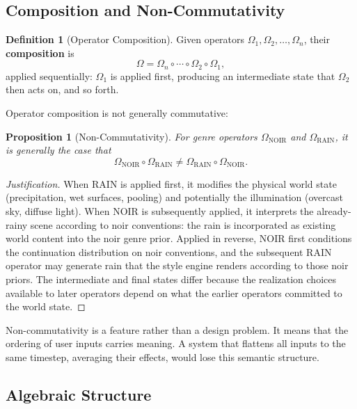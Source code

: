 \documentclass[12pt,a4paper]{article}
\theoremstyle{plain}
\newtheorem{proposition}[theorem]{Proposition}
\theoremstyle{definition}
\newtheorem{definition}[theorem]{Definition}
\theoremstyle{remark}
\begin{document}
\subsection{Composition and Non-Commutativity}

\begin{definition}[Operator Composition]
Given operators $\Omega_1, \Omega_2, \ldots, \Omega_n$, their \textbf{composition} is
\[
\Omega = \Omega_n \circ \cdots \circ \Omega_2 \circ \Omega_1,
\]
applied sequentially: $\Omega_1$ is applied first, producing an intermediate state that $\Omega_2$ then acts on, and so forth.
\end{definition}

Operator composition is not generally commutative:

\begin{proposition}[Non-Commutativity]
For genre operators $\Omega_{\mathrm{NOIR}}$ and $\Omega_{\mathrm{RAIN}}$, it is generally the case that
\[
\Omega_{\mathrm{NOIR}} \circ \Omega_{\mathrm{RAIN}} \neq \Omega_{\mathrm{RAIN}} \circ \Omega_{\mathrm{NOIR}}.
\]
\end{proposition}

\begin{proof}[Justification]
When \textsc{RAIN} is applied first, it modifies the physical world state (precipitation, wet surfaces, pooling) and potentially the illumination (overcast sky, diffuse light). When \textsc{NOIR} is subsequently applied, it interprets the already-rainy scene according to noir conventions: the rain is incorporated as existing world content into the noir genre prior. Applied in reverse, \textsc{NOIR} first conditions the continuation distribution on noir conventions, and the subsequent \textsc{RAIN} operator may generate rain that the style engine renders according to those noir priors. The intermediate and final states differ because the realization choices available to later operators depend on what the earlier operators committed to the world state.
\end{proof}

Non-commutativity is a feature rather than a design problem. It means that the ordering of user inputs carries meaning. A system that flattens all inputs to the same timestep, averaging their effects, would lose this semantic structure.

\subsection{Algebraic Structure}
\end{document}
